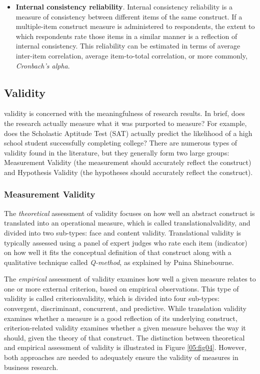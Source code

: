 \begin{itemize}
	\item \textbf{Internal consistency reliability}. Internal consistency reliability is a measure of consistency between different items of the same construct. If a multiple-item construct measure is administered to respondents, the extent to which respondents rate those items in a similar manner is a reflection of internal consistency. This reliability can be estimated in terms of average inter-item correlation, average item-to-total correlation, or more commonly, \textit{Cronbach’s alpha}. 

\end{itemize}

\subsection{Validity}

\Gls{validity} is concerned with the meaningfulness of research results. In brief, does the research actually measure what it was purported to measure? For example, does the Scholastic Aptitude Test (SAT) actually predict the likelihood of a high school student successfully completing college?\cite{drost2011validity} There are numerous types of validity found in the literature, but they generally form two large groups: Measurement Validity (the measurement should accurately reflect the construct) and Hypothesis Validity (the hypotheses should accurately reflect the construct).

\subsubsection{Measurement Validity}

The \textit{theoretical} assessment of validity focuses on how well an abstract construct is translated into an operational measure, which is called \gls{translationalvalidity}, and divided into two sub-types: face and content validity. Translational validity is typically assessed using a panel of expert judges who rate each item (indicator) on how well it fits the conceptual definition of that construct along with a qualitative technique called \textit{Q-method}, as explained by Pnina Shinebourne\cite{shinebourne2009using}.

The \textit{empirical} assessment of validity examines how well a given measure relates to one or more external criterion, based on empirical observations. This type of validity is called \gls{criterionvalidity}, which is divided into four sub-types: convergent, discriminant, concurrent, and predictive. While translation validity examines whether a measure is a good reflection of its underlying construct, criterion-related validity examines whether a given measure behaves the way it should, given the theory of that construct. The distinction between theoretical and empirical assessment of validity is illustrated in Figure \ref{05:fig04}. However, both approaches are needed to adequately ensure the validity of measures in business research.

